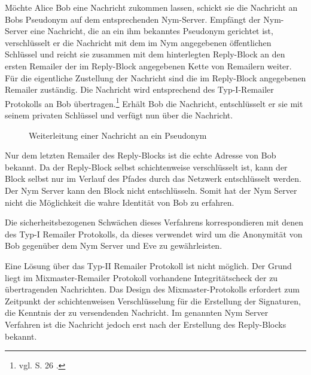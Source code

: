 Möchte Alice Bob eine Nachricht zukommen lassen, schickt sie die Nachricht an Bobs Pseudonym auf dem entsprechenden Nym-Server. Empfängt der Nym-Server eine Nachricht, die an ein ihm bekanntes Pseudonym gerichtet ist, verschlüsselt er die Nachricht mit dem im Nym angegebenen öffentlichen Schlüssel und reicht sie zusammen mit dem hinterlegten Reply-Block an den ersten Remailer der im Reply-Block angegebenen Kette von Remailern weiter. Für die eigentliche Zustellung der Nachricht sind die im Reply-Block angegebenen Remailer zuständig. Die Nachricht wird entsprechend des Typ-I-Remailer Protokolls an Bob übertragen.\footnote{vgl. S. 26 \cite{loesing2009privacy}.} Erhält Bob die Nachricht, entschlüsselt er sie mit seinem privaten Schlüssel und verfügt nun über die Nachricht. 

\newpage

\begin{figure}
	\centering
	\begin{sequencediagram}
	\end{sequencediagram}
	\caption{Weiterleitung einer Nachricht an ein Pseudonym}
\end{figure}

Nur dem letzten Remailer des Reply-Blocks ist die echte Adresse von Bob bekannt. Da der Reply-Block selbst schichtenweise verschlüsselt ist, kann der Block selbst nur im Verlauf des Pfades durch das Netzwerk entschlüsselt werden. Der Nym Server kann den Block nicht entschlüsseln. Somit hat der Nym Server nicht die Möglichkeit die wahre Identität von Bob zu erfahren.

Die sicherheitsbezogenen Schwächen dieses Verfahrens korrespondieren mit denen des Typ-I Remailer Protokolls, da dieses verwendet wird um die Anonymität von Bob gegenüber dem Nym Server und Eve zu gewährleisten.

Eine Lösung über das Typ-II Remailer Protokoll ist nicht möglich. Der Grund liegt im Mixmaster-Remailer Protokoll vorhandene Integritätscheck der zu übertragenden Nachrichten. Das Design des Mixmaster-Protokolls erfordert zum Zeitpunkt der schichtenweisen Verschlüsselung für die Erstellung der Signaturen, die Kenntnis der zu versendenden Nachricht. Im genannten Nym Server Verfahren ist die Nachricht jedoch erst nach der Erstellung des Reply-Blocks bekannt.